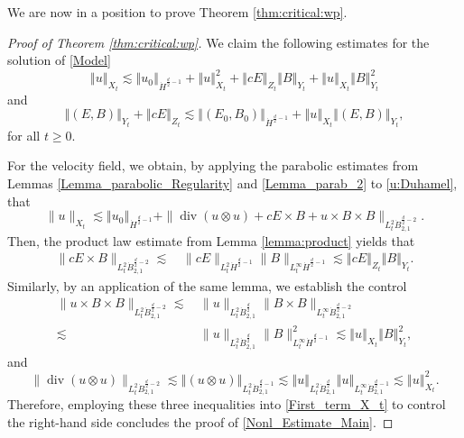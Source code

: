 \documentclass[11pt, leqno, a4paper,]{amsart}
\theoremstyle{remark}
\numberwithin{equation}{section}
\newcommand*{\norm}[1]{\left\Vert #1\right\Vert}
\renewcommand*{\div}{\operatorname{div}}
\begin{document}
We are now in a position to prove Theorem \ref{thm:critical:wp}.
\begin{proof}[Proof of Theorem \ref{thm:critical:wp}]
We claim the following estimates for the solution of \eqref{Model} 
\begin{equation}\label{Nonl_Estimate_Main}
	\norm {u}_{X_t} \lesssim \norm {u_0}_{\dot H^{\frac{d}{2}-1}} + \norm {u}_{X_t}^2 +\norm {cE}_{Z_t} \norm {B}_{Y_t} + \norm {u}_{X_t} \norm {B}_{Y_t}^2
\end{equation}
and
\begin{equation} \label{EB:Estimate}
	\norm {(E,B)}_{Y_t} + \norm {cE}_{Z_t} \lesssim \norm {(E_0,B_0)}_{\dot H^{\frac{d}{2}-1}}+ \norm {u}_{X_t} \norm {(E,B)}_{Y_t},
\end{equation}
for all $t\geq 0$. 

For the velocity field, we obtain, by applying the parabolic estimates from Lemmas \ref{Lemma_parabolic_Regularity}  and \ref{Lemma_parab_2} to \eqref{u:Duhamel}, that    
\begin{equation}\label{First_term_X_t}
\|u\|_{X_t}\lesssim \norm {u_0}_{\dot H^{\frac{d}{2}-1}}+\| \div (u\otimes u) + c E\times B + u\times B \times B\|_{L^2_t \dot{B}^{\frac{d}{2}-2}_{2,1}}. 
\end{equation}
 Then, the  product law estimate  from Lemma \ref{lemma:product} yields that 
 \begin{equation}\label{Esti_E_B}
 \begin{aligned}
\|cE\times B\|_{L^2_t\dot{B}^{\frac{d}{2}-2}_{2,1}}\lesssim &\,\|cE\|_{L^2_t\dot{H}^{\frac{d}{2}-1}}\|B\|_{L^\infty_t\dot{H}^{\frac{d}{2}-1}}\lesssim \norm {cE}_{Z_t} \norm {B}_{Y_t}. 
\end{aligned}
\end{equation}
Similarly, by an application of the same lemma, we establish the control 
\begin{equation}\label{B_term_1}
\begin{aligned}
\|  u\times B \times B\|_{L^2_t\dot{B}^{\frac{d}{2}-2}_{2,1}}\lesssim &\, \|u\|_{L^2_t\dot{B}_{2,1}^{\frac{d}{2}}}\|B\times B\|_{L^\infty_t\dot{B}^{\frac{d}{2}-2}_{2,1}}\\
\lesssim&\,\|u\|_{L^2_t\dot{B}_{2,1}^{\frac{d}{2}}}\|B\|_{L^\infty_t\dot{H}^{\frac{d}{2}-1}}^2 \lesssim  \norm {u}_{X_t} \norm {B}_{Y_t}^2,
\end{aligned}
\end{equation}
and
\begin{equation}\label{prodcut_Est_u}
	\| \div (u\otimes u)\|_{L^2_t\dot{B}^{\frac{d}{2}-2}_{2,1}}\lesssim \norm {  (u\otimes u)}_{L^2_{t}\dot B^{ \frac{d}{2} -1}_{2,1}} \lesssim \norm u_{L^2_{t}\dot B^{ \frac{d}{2} }_{2,1}} \norm u_{ L^\infty _{t}\dot B^{ \frac{d}{2} -1}_{2,1}} \lesssim \norm u_{X_t}^2.
\end{equation}
  Therefore, employing  these three inequalities into \eqref{First_term_X_t}  to control the right-hand side concludes    the proof of \eqref{Nonl_Estimate_Main}.
   

\end{proof}
\end{document}
